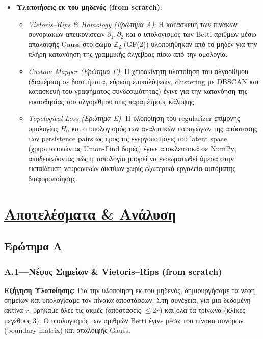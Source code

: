 \documentclass[12pt]{article}
\newcommand{\en}[1]{\foreignlanguage{english}{#1}}
\begin{document}
\begin{itemize}
    \item \textbf{Υλοποιήσεις εκ του μηδενός (\en{from scratch})}:
    \begin{itemize}
        \item \textit{\en{Vietoris--Rips} \& \en{Homology} (Ερώτημα Α)}: Η κατασκευή των πινάκων συνοριακών απεικονίσεων $\partial_1, \partial_2$ και ο υπολογισμός των \en{Betti} αριθμών μέσω απαλοιφής \en{Gauss} στο σώμα $\mathbb{Z}_2$ (\en{GF(2)}) υλοποιήθηκαν από το μηδέν για την πλήρη κατανόηση της γραμμικής άλγεβρας πίσω από την ομολογία.
        \item \textit{\en{Custom} \en{Mapper} (Ερώτημα Γ)}: Η χειροκίνητη υλοποίηση του αλγορίθμου (διαμέριση σε διαστήματα, εύρεση επικαλύψεων, \en{clustering} με \en{DBSCAN} και κατασκευή του γραφήματος συνδεσιμότητας) έγινε για την κατανόηση της ευαισθησίας του αλγορίθμου στις παραμέτρους κάλυψης.
        \item \textit{\en{Topological Loss} (Ερώτημα Ε)}: Η υλοποίηση του \en{regularizer} επίμονης ομολογίας $H_0$ και ο υπολογισμός των αναλυτικών παραγώγων της απόστασης των \en{persistence pairs} ως προς τις ενεργοποιήσεις του \en{latent space} (χρησιμοποιώντας \en{Union-Find} δομές) έγινε αποκλειστικά σε \en{NumPy}, αποδεικνύοντας πώς η τοπολογία μπορεί να ενσωματωθεί άμεσα στην εκπαίδευση νευρωνικών δικτύων χωρίς εξωτερικά εργαλεία αυτόματης διαφοροποίησης.
    \end{itemize}
\end{itemize}

\newpage
\section{\texorpdfstring{\underline{Αποτελέσματα \& Ανάλυση}}{Αποτελέσματα \& Ανάλυση}}
\vspace{1em}

\subsection{Ερώτημα Α}
\vspace{1em}

\subsubsection{Α.1—Νέφος Σημείων \& \foreignlanguage{english}{Vietoris--Rips} (\foreignlanguage{english}{from scratch})}
\vspace{0.5em}

\vspace{1em}
\textbf{Εξήγηση Υλοποίησης:}
Για την υλοποίηση εκ του μηδενός, δημιουργήσαμε τα νέφη σημείων και υπολογίσαμε τον πίνακα αποστάσεων. Στη συνέχεια, για μια δεδομένη ακτίνα $r$, βρήκαμε όλες τις ακμές (αποστάσεις $\le 2r$) και όλα τα τρίγωνα (κλίκες μεγέθους 3). Ο υπολογισμός των αριθμών \foreignlanguage{english}{Betti} έγινε μέσω του πίνακα συνόρων (\foreignlanguage{english}{boundary matrix}) και απαλοιφής \foreignlanguage{english}{Gauss}.
\end{document}

